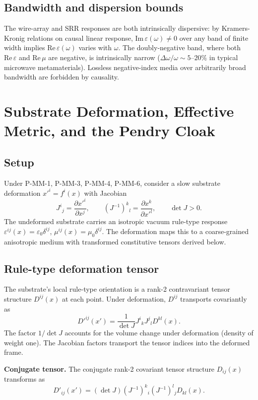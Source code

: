 \documentclass[11pt,a4paper]{article}
\begin{document}
\subsection{Bandwidth and dispersion bounds}

The wire-array and SRR responses are both intrinsically dispersive: by Kramers-Kronig relations on causal linear response, $\mathrm{Im}\,\varepsilon(\omega) \neq 0$ over any band of finite width implies $\mathrm{Re}\,\varepsilon(\omega)$ varies with $\omega$. The doubly-negative band, where both $\mathrm{Re}\,\varepsilon$ and $\mathrm{Re}\,\mu$ are negative, is intrinsically narrow ($\Delta\omega/\omega \sim 5$--$20\%$ in typical microwave metamaterials). Lossless negative-index media over arbitrarily broad bandwidth are forbidden by causality.

\section{Substrate Deformation, Effective Metric, and the Pendry Cloak}

\subsection{Setup}

Under P-MM-1, P-MM-3, P-MM-4, P-MM-6, consider a slow substrate deformation $x'^i = f^i(x)$ with Jacobian
\[
J^i{}_j = \frac{\partial x'^i}{\partial x^j}, \qquad (J^{-1})^k{}_l = \frac{\partial x^k}{\partial x'^l}, \qquad \det J > 0.
\]
The undeformed substrate carries an isotropic vacuum rule-type response $\varepsilon^{ij}(x) = \varepsilon_0\delta^{ij}$, $\mu^{ij}(x) = \mu_0\delta^{ij}$. The deformation maps this to a coarse-grained anisotropic medium with transformed constitutive tensors derived below.

\subsection{Rule-type deformation tensor}

The substrate's local rule-type orientation is a rank-2 contravariant tensor structure $D^{ij}(x)$ at each point. Under deformation, $D^{ij}$ transports covariantly as
\[
D'^{ij}(x') = \frac{1}{\det J} J^i{}_k J^j{}_l D^{kl}(x).
\]
The factor $1/\det J$ accounts for the volume change under deformation (density of weight one). The Jacobian factors transport the tensor indices into the deformed frame.

\textbf{Conjugate tensor.} The conjugate rank-2 covariant tensor structure $D_{ij}(x)$ transforms as
\[
D'_{ij}(x') = (\det J)(J^{-1})^k{}_i (J^{-1})^l{}_j D_{kl}(x).
\]
\end{document}

